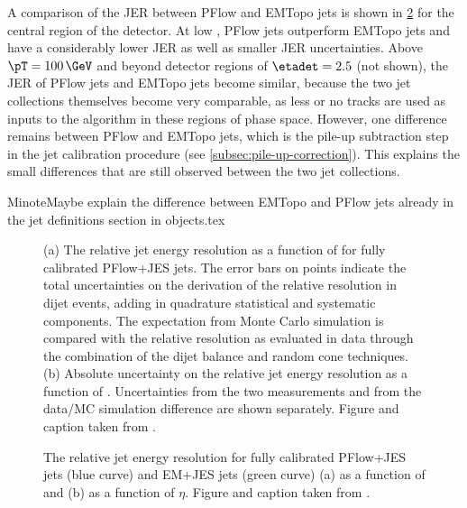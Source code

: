 A comparison of the JER between PFlow and EMTopo jets is shown in \cref{fig:jer-combination-results} for the central region of the detector.
At low \pT, PFlow jets outperform EMTopo jets and have a considerably lower JER as well as smaller JER uncertainties.
Above $\pT=100\,\GeV$ and beyond detector regions of $\etadet = 2.5$ (not shown), the JER of PFlow jets and EMTopo jets become similar, because the two jet collections themselves become very comparable, as less or no tracks are used as inputs to the \antikt algorithm in these regions of phase space. However, one difference remains between PFlow and EMTopo jets, which is the pile-up subtraction step in the jet calibration procedure (see \cref{subsec:pile-up-correction}). This explains the small differences that are still observed between the two jet collections.

Minote{}{Maybe explain the difference between EMTopo and PFlow jets already in the jet definitions section in objects.tex}


\FloatBarrier
\begin{figure}[t]
    \caption{(a) The relative jet energy resolution as a function of \pT for fully calibrated PFlow+JES jets. The error bars on points indicate the total uncertainties on the derivation of the relative resolution in dijet events, adding in quadrature statistical and systematic components. The expectation from Monte Carlo simulation is compared with the relative resolution as evaluated in data through the combination of the dijet balance and random cone techniques. (b) Absolute uncertainty on the relative jet energy resolution as a function of \pTjet. Uncertainties from the two \insitu measurements and from the data/MC simulation difference are shown separately. Figure and caption taken from .}
    \label{fig:jer-combination-incl-noise-term}
\end{figure}


\begin{figure}[t]
    \caption{The relative jet energy resolution for fully calibrated PFlow+JES jets (blue curve) and EM+JES jets (green curve) (a) as a function of \pTjet and (b) as a function of $\eta$. Figure and caption taken from .}
    \label{fig:jer-combination-results}
\end{figure}



